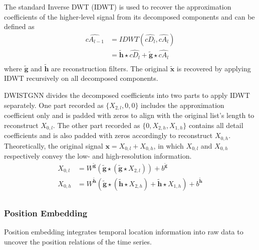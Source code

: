 \documentclass[final,12pt]{elsarticle}
\begin{document}
The standard Inverse DWT (IDWT) is used 
to recover the approximation coefficients 
of the higher-level signal from its decomposed components 
and can be defined as 
\begin{equation}
  \begin{aligned}
    \widehat{cA_{l-1}} &= IDWT( \widehat{cD_{l}}, \widehat{cA_{l}} )  \\
                       &= \tilde{\textbf{h}} \star \widehat{cD_{l}} 
                        + \tilde{\textbf{g}} \star \widehat{cA_{l}}  \\
  \end{aligned}
\end{equation}  %
where $\tilde{\textbf{g}}$ and $\tilde{\textbf{h}}$ are reconstruction filters.
The original $\tilde{\textbf{x}}$ is recovered 
by applying IDWT recursively on all decomposed components.  %

DWISTGNN divides the decomposed coefficients into two parts 
to apply IDWT separately.  %
One part recorded as $\{ X_{2, l}, 0, 0 \}$ 
includes the approximation coefficient only 
and is padded with zeros to align with the original list's length 
to reconstruct $X_{0, l}$.  %
The other part recorded as $\{ 0, X_{2, h}, X_{1, h} \}$ 
contains all detail coefficients 
and is also padded with zeros accordingly 
to reconstruct $X_{0, h}$.  %
Theoretically, the original signal $\textbf{x}=X_{0, l}+X_{0, h}$, 
in which $X_{0, l}$ and $X_{0, h}$ respectively 
convey the low- and high-resolution information.  %
\begin{equation}
  \begin{aligned}
    X_{0, l} &= W^{\tilde{\textbf{g}}} 
                ( \tilde{\textbf{g}} \star 
                ( \tilde{\textbf{g}} \star X_{2, l} )) 
                + b^{\tilde{\textbf{g}}}  \\
    X_{0, h} &= W^{\tilde{\textbf{h}}} 
                ( \tilde{\textbf{g}} \star (\tilde{\textbf{h}} \star X_{2, h}) + 
                  \tilde{\textbf{h}} \star X_{1, h}) 
                + b^{\tilde{\textbf{h}}}  \\
  \end{aligned}
\end{equation}  %


\subsubsection{Position Embedding}
\label{subsubsec-4.2.2}


Position embedding integrates temporal location information into raw data 
to uncover the position relations of the time series.  %
\end{document}

